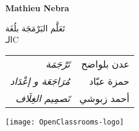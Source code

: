 \thispagestyle{empty}
\cleardoublepage
\thispagestyle{empty}
\begin{center}
{\fontsize{0.7cm}{1.4cm}\selectfont\bfseries
\textcolor{section}{\textenglish{Mathieu Nebra}}
}

\vspace{1cm}
\textcolor{chapter}{\mdseries
{\fontsize{2cm}{4cm}\selectfont
تَعَلَّم البَرْمَجَة بلُغَة}\\
{\fontsize{3cm}{6cm}\selectfont
الـ\textenglish{C}
}
}

\vfill

{
\fontsize{0.5cm}{1.5cm}\selectfont

\begin{tabu} to 0.5
تَرْجَمَة & عدن بلواضح\\
مُرَاجَعَة و إعْدَاد & حمزة عبّاد\\
تَصمِيم الغِلَاف & أحمد زبوشي\\
\end{tabu}
}

\vfill
\texttt{[image: OpenClassrooms-logo]}
\end{center}

